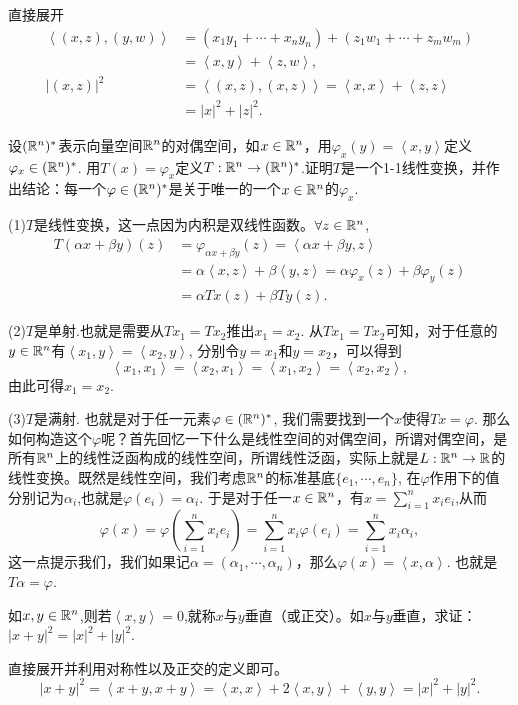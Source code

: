 \begin{problemset}
直接展开
\[
\begin{aligned}
\left<(x,z),(y,w)\right> &= (x_1y_1+\cdots+x_ny_n) + (z_1w_1+\cdots+z_mw_m)\\
&=\left<x, y\right> + \left<z,w\right>,\\
|(x,z)|^2 &= \left<(x,z),(x,z)\right> = \left<x,x\right>+\left<z,z\right>\\
&=|x|^2+|z|^2.
\end{aligned}
\]

\item 设$(\mathbb{R}^n)^*$表示向量空间$\mathbb{R}^n$的对偶空间，如$x \in \mathbb{R}^n$，用$\varphi_x(y) = \left<x, y\right>$定义$\varphi_x \in (\mathbb{R}^n)^*$. 用$T(x) = \varphi_x$定义$T: \mathbb{R}^n \to (\mathbb{R}^n)^*$.证明$T$是一个1-1线性变换，并作出结论：每一个$\varphi \in (\mathbb{R}^n)^*$是关于唯一的一个$x \in \mathbb{R}^n$的$\varphi_x$.

(1)$T$是线性变换，这一点因为内积是双线性函数。$\forall z \in \mathbb{R}^n$,
\[
\begin{aligned}
T(\alpha{}x+\beta{}y)(z) &= \varphi_{\alpha{}x+\beta{}y}(z) = \left<\alpha{}x + \beta{}y, z\right> \\
&=\alpha\left<x,z\right> + \beta\left<y, z\right> = \alpha\varphi_x(z) + \beta\varphi_y(z) \\
&= \alpha{}Tx(z)+\beta{}Ty(z).
\end{aligned}
\]

(2)$T$是单射.也就是需要从$Tx_1=Tx_2$推出$x_1=x_2$. 从$Tx_1=Tx_2$可知，对于任意的$y \in \mathbb{R}^n$有$\left<x_1, y\right> = \left<x_2,y\right>$, 分别令$y=x_1$和$y=x_2$，可以得到
\[
\left<x_1,x_1\right> = \left<x_2,x_1\right>=\left<x_1, x_2\right> = \left<x_2,x_2\right>,
\]
由此可得$x_1=x_2$.


(3)$T$是满射. 也就是对于任一元素$\varphi \in (\mathbb{R}^n)^*$, 我们需要找到一个$x$使得$Tx = \varphi$. 那么如何构造这个$\varphi$呢？首先回忆一下什么是线性空间的对偶空间，所谓对偶空间，是所有$\mathbb{R}^n$上的线性泛函构成的线性空间，所谓线性泛函，实际上就是$L:\mathbb{R}^n \to \mathbb{R}$的线性变换。既然是线性空间，我们考虑$\mathbb{R}^n$的标准基底$\{e_1,\cdots,e_n\}$, 在$\varphi$作用下的值分别记为$\alpha_i$,也就是$\varphi(e_i) = \alpha_i$. 于是对于任一$x \in \mathbb{R}^n$，有$x = \sum\limits_{i=1}^{n}{x_ie_i}$,从而
\[
\varphi(x) = \varphi(\sum_{i=1}^{n}{x_ie_i}) = \sum_{i=1}^{n}{x_i\varphi(e_i)} = \sum_{i=1}^{n}{x_i\alpha_i},
\]
这一点提示我们，我们如果记$\alpha=(\alpha_1,\cdots, \alpha_n)$，那么$\varphi(x)=\left<x,\alpha\right>$. 也就是$T\alpha=\varphi$.


\item 如$x, y \in \mathbb{R}^n$,则若$\left<x,y\right>=0$,就称$x$与$y$垂直（或正交）。如$x$与$y$垂直，求证：$|x+y|^2 = |x|^2 + |y|^2$.

直接展开并利用对称性以及正交的定义即可。
\[
|x+y|^2 = \left<x+y,x+y\right> = \left<x,x\right> + 2\left<x,y\right> + \left<y,y\right> = |x|^2+|y|^2.
\]
\end{problemset}



